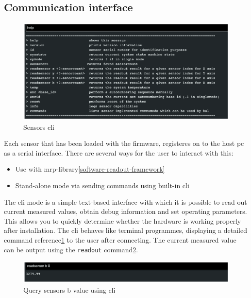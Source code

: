 \hypertarget{communication-interface}{%
\subsection{Communication interface}\label{communication-interface}}

\begin{figure}
\centering
\includegraphics{./generated_images/border_Sensors_(+cli).png}
\caption{Sensors \gls{cli} \label{Sensors_(+cli).png}}
\end{figure}

Each sensor that has been loaded with the firmware, registeres on to the
host \gls{pc} as a serial interface. There are several ways for the user
to interact with this:

\begin{itemize}
\tightlist
\item
  Use with \gls{mrp}-library\ref{software-readout-framework}
\item
  Stand-alone mode via sending commands using built-in \gls{cli}
\end{itemize}

The \gls{cli} mode is a simple text-based interface with which it is
possible to read out current measured values, obtain debug information
and set operating parameters. This allows you to quickly determine
whether the hardware is working properly after installation. The
\gls{cli} behaves like terminal programmes, displaying a detailed
command reference\ref{Sensors_(+cli).png} to the user after connecting.
The current measured value can be output using the
\passthrough{\lstinline!readout!}
command\ref{Query_sensors_b_value_using_(+cli).png}.

\begin{figure}
\centering
\includegraphics{./generated_images/border_Query_sensors_b_value_using_(+cli).png}
\caption{Query sensors b value using \gls{cli}
\label{Query_sensors_b_value_using_(+cli).png}}
\end{figure}

